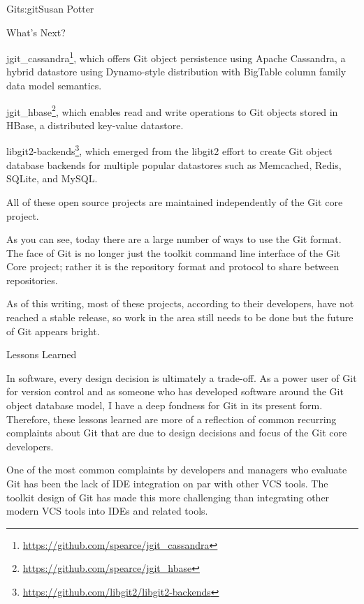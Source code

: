 \begin{aosachapter}{Git}{s:git}{Susan Potter}
\begin{aosasect1}{What's Next?}
 \begin{aosaitemize}
  \item jgit\_cassandra\footnote{\url{https://github.com/spearce/jgit\_cassandra}},
    which offers Git object persistence using Apache Cassandra, a hybrid datastore
    using Dynamo-style distribution with BigTable column family data model
    semantics.
  \item jgit\_hbase\footnote{\url{https://github.com/spearce/jgit\_hbase}},
    which enables read and write operations to Git objects stored in HBase, a
    distributed key-value datastore.
  \item libgit2-backends\footnote{\url{https://github.com/libgit2/libgit2-backends}},
    which emerged from the libgit2 effort to create Git object database
    backends for multiple popular datastores such as Memcached, Redis,
    SQLite, and MySQL.
\end{aosaitemize}

\noindent All of these open source projects are maintained independently of the Git
core project.

As you can see, today there are a large number of ways to use the Git format.
The face of Git is no longer just the toolkit command line interface of
the Git Core project; rather it is the repository format and protocol to
share between repositories.

As of this writing, most of these projects, according to their developers, have 
not reached a stable release, so work in the area still needs to be done
but the future of Git appears bright.

\end{aosasect1}

\begin{aosasect1}{Lessons Learned}

In software, every design decision is ultimately a trade-off. As a power
user of Git for version control and as someone who has developed software
around the Git object database model, I have a deep fondness for Git in its
present form. Therefore, these lessons learned are more of a reflection
of common recurring complaints about Git that are due to design decisions and
focus of the Git core developers.

One of the most common complaints by developers and managers who evaluate
Git has been the lack of IDE
integration on par with other VCS tools. The toolkit design of Git has made
this more challenging than integrating other modern VCS tools into IDEs
and related tools.


\end{aosasect1}
\end{aosachapter}
